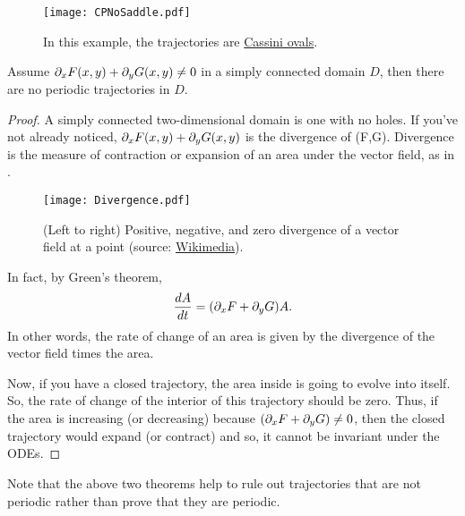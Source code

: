 \begin{figure}[!ht]
	\centering
	\texttt{[image: CPNoSaddle.pdf]}
	\caption{In this example, the trajectories are \href{https://mathworld.wolfram.com/CassiniOvals.html}{Cassini ovals}.}
	\label{fig:cpnosaddle}
\end{figure}

\begin{theorem}\label{thrm:periodictraj2}
	Assume $\partial_x F(x,y) + \partial_y G(x,y) \neq 0$ in a simply connected domain $D$, then there are no periodic trajectories in $D$.
\end{theorem}

\begin{proof}
	A simply connected two-dimensional domain is one with no holes. If you've not already noticed, $\partial_x F(x,y) + \partial_y G(x,y)$ is the divergence of (F,G). Divergence is the measure of contraction or expansion of an area under the vector field, as in .
	
	\begin{figure}[!ht]
		\centering
		\texttt{[image: Divergence.pdf]}
		\caption{(Left to right) Positive, negative, and zero divergence of a vector field at a point (source: \href{https://commons.wikimedia.org/wiki/File:Divergence_(captions).svg}{Wikimedia}).}
		\label{fig:divergence}
	\end{figure}
	
	In fact, by Green's theorem,
	\[
	\frac{dA}{dt} = (\partial_x F + \partial_y G)A.
	\]
	In other words, the rate of change of an area is given by the divergence of the vector field times the area.
	
	Now, if you have a closed trajectory, the area inside is going to evolve into itself. So, the rate of change of the interior of this trajectory should be zero. Thus, if the area is increasing (or decreasing) because $(\partial_x F + \partial_y G) \neq 0$, then the closed trajectory would expand (or contract) and so, it cannot be invariant under the ODEs.
\end{proof}

\begin{remark}
	Note that the above two theorems help to rule out trajectories that are not periodic rather than prove that they are periodic.
\end{remark}

